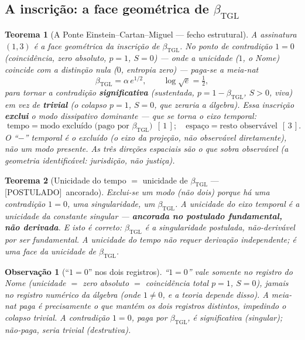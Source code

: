 \documentclass[11pt,a4paper]{article}
\newcommand{\POST}{\textsf{[POSTULADO]}}
\newcommand{\bTGL}{\beta_{\mathrm{TGL}}}
\newtheorem{theorem}{Teorema}
\newtheorem{remark}{Observação}
\begin{document}
\subsection{A inscrição: a face geométrica de $\bTGL$}
\begin{theorem}[A Ponte Einstein--Cartan--Miguel --- fecho estrutural]
\label{thm:ponte}
A assinatura $(1,3)$ é a face geométrica da inscrição de $\bTGL$. No ponto
de contradição $1{=}0$ (coincidência, zero absoluto, $p=1$, $S=0$) --- onde a
unicidade ($1$, o Nome) coincide com a distinção nula ($0$, entropia zero)
--- paga-se a meia-nat
\begin{equation}
\bTGL=\alpha\,e^{1/2},\qquad \log\sqrt e=\tfrac12,
\end{equation}
para tornar a contradição \textbf{significativa} (sustentada, $p=1-\bTGL$,
$S>0$, viva) em vez de \textbf{trivial} (o colapso $p=1$, $S=0$, que zeraria a
álgebra). Essa inscrição \textbf{exclui} o modo dissipativo dominante --- que
se torna o eixo temporal:
\begin{equation}
\boxed{\;
\text{tempo} = \text{modo excluído (pago por }\bTGL)\ \ [\,1\,];
\quad
\text{espaço} = \text{resto observável}\ \ [\,3\,].
\;}
\end{equation}
O ``$-$'' temporal é o \emph{excluído} (o eixo \emph{da} projeção, não
observável diretamente), não um modo presente. As três direções espaciais
são o que sobra observável (a geometria identificável: jurisdição, não
justiça).
\end{theorem}

\begin{theorem}[Unicidade do tempo $=$ unicidade de $\bTGL$ --- \POST\ ancorado]
Exclui-se \emph{um} modo (não dois) porque há \emph{uma} contradição $1{=}0$,
\emph{uma} singularidade, \emph{um} $\bTGL$. A unicidade do eixo temporal é a
unicidade da constante singular --- \textbf{ancorada no postulado fundamental,
não derivada}. E isto é correto: $\bTGL$ é a singularidade postulada,
não-derivável por ser fundamental. A unicidade do tempo não requer derivação
independente; é uma face da unicidade de $\bTGL$.
\end{theorem}

\begin{remark}[``$1=0$'' nos dois registros]
``$1=0$'' vale \emph{somente} no registro do Nome (unicidade $=$ zero absoluto
$=$ coincidência total $p=1$, $S=0$), \emph{jamais} no registro numérico da
álgebra (onde $1\neq0$, e a teoria depende disso). A meia-nat paga é
precisamente o que mantém os dois registros distintos, impedindo o colapso
trivial. A contradição $1{=}0$, paga por $\bTGL$, é significativa (singular);
não-paga, seria trivial (destrutiva).
\end{remark}
\end{document}
